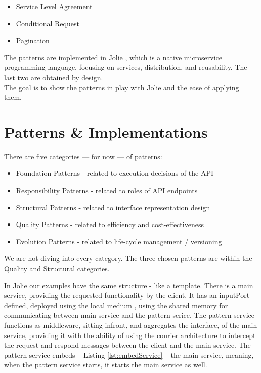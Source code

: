 \documentclass[12pt]{article}
\begin{document}
\begin{itemize}
    \item Service Level Agreement
    \item Conditional Request
    \item Pagination
\end{itemize}

The patterns are implemented in Jolie \cite{JolieAboutPage}, which is a native microservice programming language, focusing on services, distribution, and reusability. The last two are obtained by design. \\
The goal is to show the patterns in play with Jolie and the ease of applying them. 

\newpage

\section{Patterns \& Implementations}

There are five categories --- for now --- of  patterns: 

\begin{itemize}
    \item Foundation Patterns - related to execution decisions of the API
    \item Responsibility Patterns - related to roles of API endpoints
    \item Structural Patterns - related to interface representation design
    \item Quality Patterns - related to efficiency and cost-effectiveness
    \item Evolution Patterns - related to life-cycle management / versioning
\end{itemize}

We are not diving into every category. The three chosen patterns are within the Quality and Structural categories. 

In Jolie our examples have the same structure - like a template. There is a main service, providing the requested functionality by the client. It has an inputPort defined, deployed using the local medium \cite{LocalLoc}, using the shared memory for communicating between main service and the pattern serice. The pattern service functions as middleware, sitting infront, and aggregates the interface, of the main service, providing it with the ability of using the courier \cite{Courier} architecture to intercept the request and respond messages between the client and the main service. The pattern service embeds -- Listing \ref{lst:embedService} -- the main service, meaning, when the pattern service starts, it starts the main service as well. 
\end{document}
